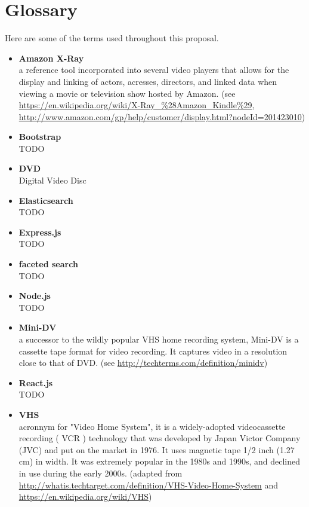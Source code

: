 %
\pagestyle{empty}
\hfill
{}
\section*{Glossary}


Here are some of the terms used throughout this proposal.

\begin{itemize}[leftmargin=*]
\label{glossary:amazon-x-ray}
\item \textbf{Amazon X-Ray} \\
	a reference tool incorporated into several video players that allows for the display and linking of actors, acresses, directors, and linked data when viewing a movie or television show hosted by Amazon. (see \url{https://en.wikipedia.org/wiki/X-Ray_%28Amazon_Kindle%29}, \url{http://www.amazon.com/gp/help/customer/display.html?nodeId=201423010})
\label{glossary:bootstrap}
\item \textbf{Bootstrap} \\
	TODO
\label{glossary:dvd}
\item \textbf{DVD} \\
	Digital Video Disc
\label{glossary:elasticsearch}
\item \textbf{Elasticsearch} \\
	TODO
\label{glossary:express.js}
\item \textbf{Express.js} \\
	TODO
\label{glossary:faceted-search}
\item \textbf{faceted search} \\
	TODO
\label{glossary:node.js}
\item \textbf{Node.js} \\
	TODO
\label{glossary:mini-dv}
\item \textbf{Mini-DV} \\
	a successor to the wildly popular VHS home recording system, Mini-DV is a cassette tape format for video recording. It captures video in a resolution close to that of DVD. (see \url{http://techterms.com/definition/minidv})
\label{glossary:react.js}
\item \textbf{React.js} \\
	TODO
\label{glossary:vhs}
\item \textbf{VHS} \\
	acronnym for "Video Home System", it is a widely-adopted videocassette recording ( VCR ) technology that was developed by Japan Victor Company (JVC) and put on the market in 1976. It uses magnetic tape 1/2 inch (1.27 cm) in width.  It was extremely popular in the 1980s and 1990s, and declined in use during the early 2000s. (adapted from \url{http://whatis.techtarget.com/definition/VHS-Video-Home-System} and \url{https://en.wikipedia.org/wiki/VHS})
\end{itemize}
